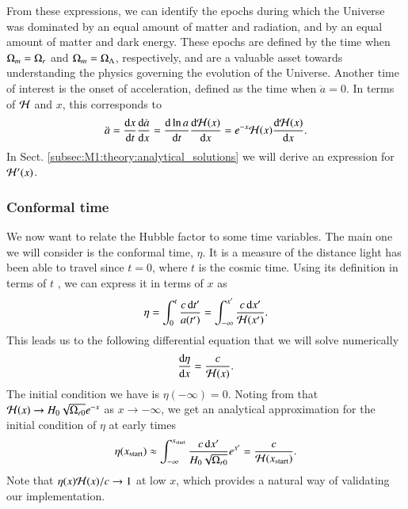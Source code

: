 From these expressions, we can identify the epochs during which the Universe was dominated by an equal amount of matter and radiation, and by an equal amount of matter and dark energy. These epochs are defined by the time when $\Omega_{m}=\Omega_{r}$ and $\Omega_{m}=\Omega_{\Lambda}$, respectively, and are a valuable asset towards understanding the physics governing the evolution of the Universe. Another time of interest is the onset of acceleration, defined as the time when $\ddot{a}=0$. In terms of $\mathcal{H}$ and $x$, this corresponds to 
\begin{equation}
    \ddot{a} = \dv{x}{t}\dv{\dot{a}}{x}=\dv{\ln a}{t}\dv{\mathcal{H}(x)}{x} = e^{-x} \mathcal{H}(x) \dv{\mathcal{H}(x)}{x}. \label{eq:M1:theory:acceleration_onset}
\end{equation}   
In Sect. \ref{subsec:M1:theory:analytical_solutions} we will derive an expression for $\mathcal{H}'(x)$. 

\subsubsection{Conformal time} \label{sssec:M1:theory:conformal_time}
We now want to relate the Hubble factor to some time variables. The main one we will consider is the conformal time, $\eta$. It is a measure of the distance light has been able to travel since $t=0$, where $t$ is the cosmic time. Using its definition in terms of $t$ \cite[Eq. (2.90)]{Dodelson}, we can express it in terms of $x$ as 
\begin{equation}
    \eta = \int_0^t \frac{c \, \dd t'}{a(t')} = \int_{-\infty}^{x'} \frac{c\,\dd x'}{\mathcal{H}(x')}. \label{eq:M1:theory:eta_of_x_integral_expression}
\end{equation}
%
This leads us to the following differential equation that we will solve numerically 
\begin{equation}
    \dv{\eta}{x} = \frac{c}{\mathcal{H}(x)}. \label{eq:M1:theory:eta_ODE}
\end{equation}
%
The initial condition we have is $\eta(-\infty)=0$. Noting from  that $\mathcal{H}(x)\to H_0\sqrt{\Omega_{r0}}e^{-x}$ as $x\to-\infty$, we get an analytical approximation for the initial condition of $\eta$ at early times 
\begin{align}
    \eta(x_\mathrm{start}) \approx \int_{-\infty}^{x_\mathrm{start}} \frac{c\,\dd x'}{H_0\sqrt{\Omega_{r0}}} e^{x'} = \frac{c}{\mathcal{H}(x_\mathrm{start})}. \label{eq:M1:theory:eta_of_xstart_analytical_approximation}
\end{align} 
%
Note that $\eta(x)\mathcal{H}(x)/c\to 1$ at low $x$, which provides a natural way of validating our implementation.    

